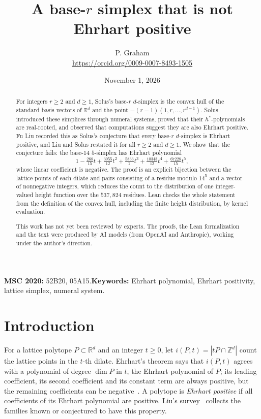 \documentclass[11pt]{article}
\title{A base-$r$ simplex that is not Ehrhart positive}
\author{P. Graham\\ \small\url{https://orcid.org/0009-0007-8493-1505}}
\date{November 1, 2026}
\theoremstyle{remark}
\newcommand{\ZZ}{\mathbb{Z}}
\newcommand{\RR}{\mathbb{R}}
\begin{document}
\maketitle
\begin{abstract}
For integers $r\ge2$ and $d\ge1$, Solus's base-$r$ $d$-simplex is the convex hull of the standard basis vectors of $\RR^d$ and the point $-(r-1)(1,r,\dots,r^{d-1})$. Solus introduced these simplices through numeral systems, proved that their $h^*$-polynomials are real-rooted, and observed that computations suggest they are also Ehrhart positive. Fu Liu recorded this as Solus's conjecture that every base-$r$ $d$-simplex is Ehrhart positive, and Liu and Solus restated it for all $r\ge2$ and $d\ge1$. We show that the conjecture fails: the base-$14$ $5$-simplex has Ehrhart polynomial
\[
1-\tfrac{268}{15}t+\tfrac{3955}{12}t^2+\tfrac{5833}{2}t^3+\tfrac{10343}{12}t^4+\tfrac{67228}{15}t^5,
\]
whose linear coefficient is negative. The proof is an explicit bijection between the lattice points of each dilate and pairs consisting of a residue modulo $14^5$ and a vector of nonnegative integers, which reduces the count to the distribution of one integer-valued height function over the $537{,}824$ residues. Lean checks the whole statement from the definition of the convex hull, including the finite height distribution, by kernel evaluation.

This work has not yet been reviewed by experts. The proofs, the Lean formalization and the text were produced by AI models (from OpenAI and Anthropic), working under the author's direction.
\end{abstract}
\medskip
\noindent\textbf{MSC 2020:} 52B20, 05A15.\quad\textbf{Keywords:} Ehrhart polynomial, Ehrhart positivity, lattice simplex, numeral system.

\section{Introduction}
For a lattice polytope $P\subset\RR^d$ and an integer $t\ge0$, let $i(P,t)=|tP\cap\ZZ^d|$ count the lattice points in the $t$-th dilate. Ehrhart's theorem says that $i(P,t)$ agrees with a polynomial of degree $\dim P$ in $t$, the Ehrhart polynomial of $P$; its leading coefficient, its second coefficient and its constant term are always positive, but the remaining coefficients can be negative~\cite[Theorem~1.1 and the discussion after it]{Liu}. A polytope is \emph{Ehrhart positive} if all coefficients of its Ehrhart polynomial are positive. Liu's survey~\cite{Liu} collects the families known or conjectured to have this property.
\end{document}
